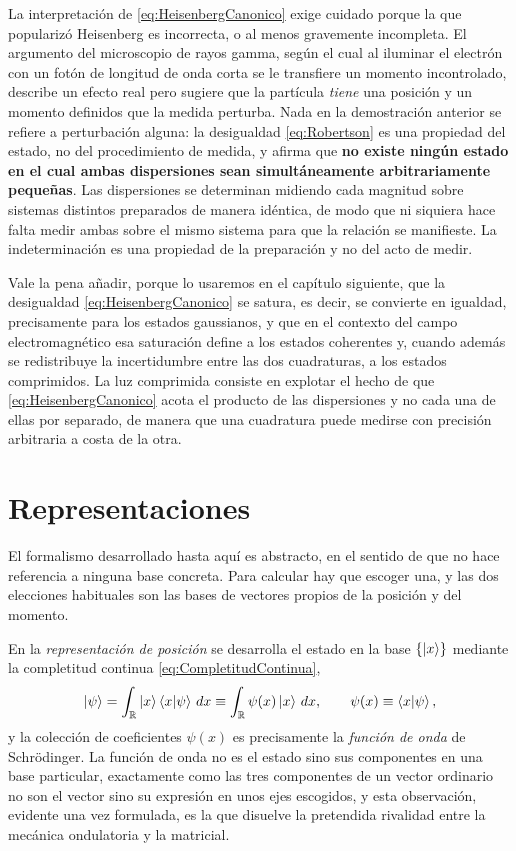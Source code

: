         La interpretación de \eqref{eq:HeisenbergCanonico} exige cuidado porque la que popularizó Heisenberg es incorrecta, o al menos gravemente incompleta. El argumento del microscopio de rayos gamma, según el cual al iluminar el electrón con un fotón de longitud de onda corta se le transfiere un momento incontrolado, describe un efecto real pero sugiere que la partícula \textit{tiene} una posición y un momento definidos que la medida perturba. Nada en la demostración anterior se refiere a perturbación alguna: la desigualdad \eqref{eq:Robertson} es una propiedad del estado, no del procedimiento de medida, y afirma que \textbf{no existe ningún estado en el cual ambas dispersiones sean simultáneamente arbitrariamente pequeñas}. Las dispersiones se determinan midiendo cada magnitud sobre sistemas distintos preparados de manera idéntica, de modo que ni siquiera hace falta medir ambas sobre el mismo sistema para que la relación se manifieste. La indeterminación es una propiedad de la preparación y no del acto de medir.

        Vale la pena añadir, porque lo usaremos en el capítulo siguiente, que la desigualdad \eqref{eq:HeisenbergCanonico} se satura, es decir, se convierte en igualdad, precisamente para los estados gaussianos, y que en el contexto del campo electromagnético esa saturación define a los estados coherentes y, cuando además se redistribuye la incertidumbre entre las dos cuadraturas, a los estados comprimidos. La luz comprimida consiste en explotar el hecho de que \eqref{eq:HeisenbergCanonico} acota el producto de las dispersiones y no cada una de ellas por separado, de manera que una cuadratura puede medirse con precisión arbitraria a costa de la otra.

\section{Representaciones}

        El formalismo desarrollado hasta aquí es abstracto, en el sentido de que no hace referencia a ninguna base concreta. Para calcular hay que escoger una, y las dos elecciones habituales son las bases de vectores propios de la posición y del momento.

        En la \textit{representación de posición} se desarrolla el estado en la base $\{\ket{x}\}$ mediante la completitud continua \eqref{eq:CompletitudContinua},
        \begin{equation}\label{eq:FuncionOnda}
            \ket{\psi} = \int_{\mathbb{R}}\ket{x}\braket{x|\psi}\,dx \equiv \int_{\mathbb{R}}\psi(x)\ket{x}\,dx,
            \qquad
            \psi(x) \equiv \braket{x|\psi},
        \end{equation}
        y la colección de coeficientes $\psi(x)$ es precisamente la \textit{función de onda} de Schrödinger. La función de onda no es el estado sino sus componentes en una base particular, exactamente como las tres componentes de un vector ordinario no son el vector sino su expresión en unos ejes escogidos, y esta observación, evidente una vez formulada, es la que disuelve la pretendida rivalidad entre la mecánica ondulatoria y la matricial.

